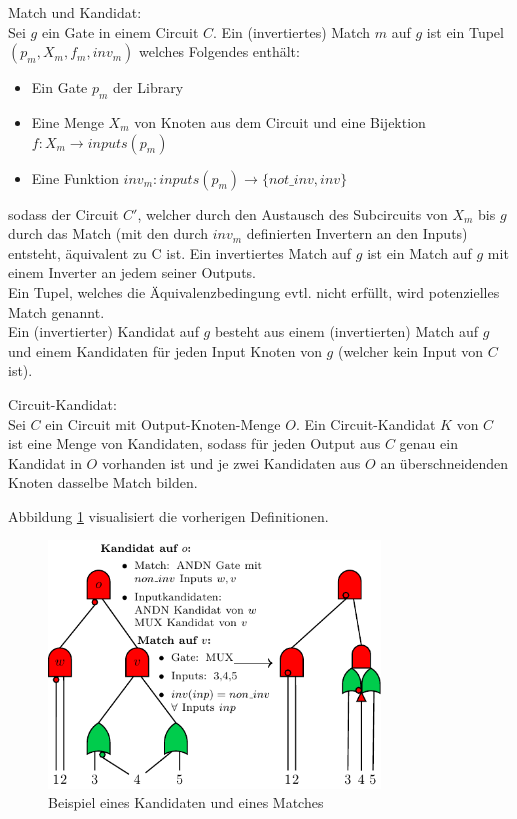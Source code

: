 \documentclass[11pt, a4paper, german]{article}
\begin{document}
\begin{definition}{Match und Kandidat:}\\
Sei $g$ ein Gate in einem Circuit $C$. Ein (invertiertes) Match $m$ auf $g$ ist ein Tupel $(p_m, X_m, f_m, inv_m)$ welches Folgendes enthält:
\begin{itemize}
\item Ein Gate $p_m$ der Library
\item Eine Menge $X_m$ von Knoten aus dem Circuit und eine Bijektion $ f: X_m \rightarrow inputs(p_m)$
\item Eine Funktion $ inv_m : inputs(p_m) \rightarrow \{not\_inv , inv \}$
\end{itemize}
sodass der Circuit $C'$, welcher durch den Austausch des Subcircuits von $X_m$ bis $g$ durch das Match (mit den durch $inv_m$ definierten Invertern an den Inputs) entsteht, äquivalent zu C ist.
Ein invertiertes Match auf $g$ ist ein Match auf $g$ mit einem Inverter an jedem seiner Outputs.\\
Ein Tupel, welches die Äquivalenzbedingung evtl. nicht erfüllt, wird potenzielles Match genannt.\\
Ein (invertierter) Kandidat auf $g$ besteht aus einem (invertierten) Match auf $g$ und einem Kandidaten für jeden Input Knoten von $g$ (welcher kein Input von $C$ ist).
\end{definition}
\begin{definition}{Circuit-Kandidat:}\\
Sei $C$ ein Circuit mit Output-Knoten-Menge $O$. Ein Circuit-Kandidat $K$ von $C$ ist eine Menge von Kandidaten, sodass für jeden Output aus $C$ genau ein Kandidat in $O$ vorhanden ist und je zwei Kandidaten aus $O$  an überschneidenden Knoten dasselbe Match bilden.
\end{definition}
Abbildung \ref{bild:grundl_definitionen} visualisiert die vorherigen Definitionen.\\
\begin{figure}[h]
\begin{center}
 \includegraphics[width = 250pt]{./pictures/compiled/grundl_def_veransch.pdf}
 \caption{Beispiel eines  Kandidaten und eines Matches}
 \label{bild:grundl_definitionen}
\end{center}
\end{figure}
\end{document}
